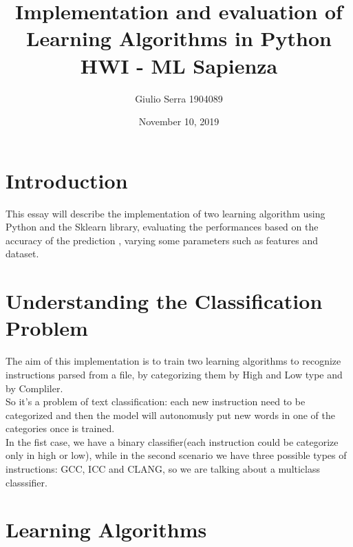 \documentclass{article}
\begin{document}
\pagecolor{white}

\title{%
  Implementation and evaluation of Learning Algorithms in Python
  \large \\HWI - ML Sapienza}

\author{Giulio Serra 1904089}
\date{November 10, 2019}

\maketitle

\begin{titlepage}
\end{titlepage}

\tableofcontents

\begin{titlepage}
\end{titlepage}


\section{Introduction}\label{sec:intro}
This essay will describe the implementation of two learning algorithm using Python and the Sklearn library, evaluating the performances based on the accuracy of the prediction , varying some parameters such as features and dataset.

\section{Understanding the Classification Problem}
The aim of this implementation is to train two learning algorithms to recognize instructions parsed from a file, by categorizing them by High and Low type and by Compliler.\\
So it's a problem of text classification: each new instruction need to be categorized and then the model will autonomusly put new words in one of the categories once is trained.\\In the fist case, we have a binary classifier(each instruction could be categorize only in high or low), while in the second scenario we have three possible types of instructions: GCC, ICC and CLANG, so we are talking about a multiclass classsifier.


\section{Learning Algorithms}\label{sec:intro}
\end{document}

